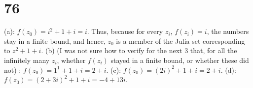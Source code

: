 \documentclass{article}
\theoremstyle{definition}
\begin{document}
\section*{76}
(a): $f(z_0)=i^2+1+i=i$. Thus, because for every $z_i$, $f(z_i)=i$, the numbers stay in a finite bound, and hence, $z_0$ is a member of 
the Julia set corresponding to $z^2+1+i$.\newline
(b) (I was not sure how to verify for the next 3 that, for all the infinitely many $z_i$, whether $f(z_i)$ stayed in a finite bound, or 
whether these 
did not)
: $f(z_0)=1^1+1+i=2+i$.\newline
(c): $f(z_0)=(2i)^2+1+i=2+i$.\newline
(d): $f(z_0)=(2+3i)^2+1+i=-4+13i$.
\end{document}

